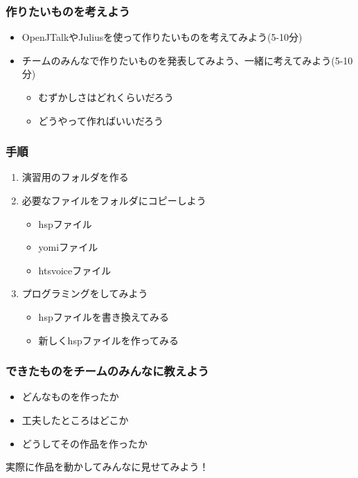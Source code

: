 \documentclass[14pt]{beamer}
\begin{document}
\begin{frame}
  \frametitle{作りたいものを考えよう}
  \begin{itemize}
    \item OpenJTalkやJuliusを使って作りたいものを考えてみよう(5-10分)
    \item チームのみんなで作りたいものを発表してみよう、一緒に考えてみよう(5-10分)
          \begin{itemize}
            \item むずかしさはどれくらいだろう
            \item どうやって作ればいいだろう
          \end{itemize}
  \end{itemize}
\end{frame}
\begin{frame}
  \frametitle{手順}
  \begin{enumerate}
    \item 演習用のフォルダを作る
    \item 必要なファイルをフォルダにコピーしよう
          \begin{itemize}
            \item hspファイル
            \item yomiファイル
            \item htsvoiceファイル
          \end{itemize}
    \item プログラミングをしてみよう
          \begin{itemize}
            \item hspファイルを書き換えてみる
            \item 新しくhspファイルを作ってみる
          \end{itemize}
  \end{enumerate}
\end{frame}

\begin{frame}
  \frametitle{できたものをチームのみんなに教えよう}
  \begin{itemize}
    \item どんなものを作ったか
    \item 工夫したところはどこか
    \item どうしてその作品を作ったか
  \end{itemize}
  実際に作品を動かしてみんなに見せてみよう！
\end{frame}
\end{document}
